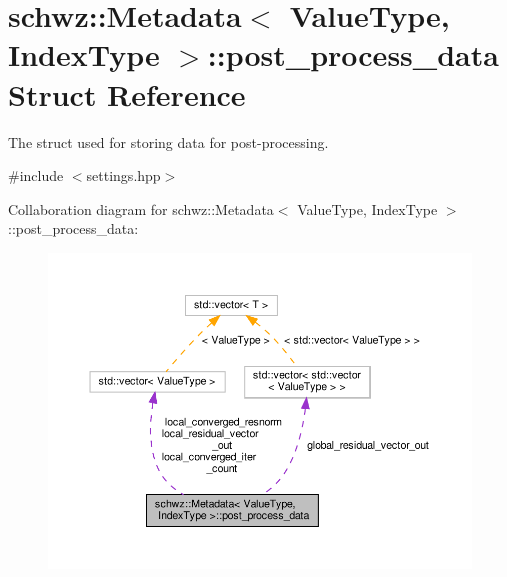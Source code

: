 \hypertarget{structschwz_1_1Metadata_1_1post__process__data}{}\section{schwz\+:\+:Metadata$<$ Value\+Type, Index\+Type $>$\+:\+:post\+\_\+process\+\_\+data Struct Reference}
\label{structschwz_1_1Metadata_1_1post__process__data}


The struct used for storing data for post-\/processing.  




{\ttfamily \#include $<$settings.\+hpp$>$}



Collaboration diagram for schwz\+:\+:Metadata$<$ Value\+Type, Index\+Type $>$\+:\+:post\+\_\+process\+\_\+data\+:
\nopagebreak
\begin{figure}[H]
\begin{center}
\leavevmode
\includegraphics[width=350pt]{structschwz_1_1Metadata_1_1post__process__data__coll__graph}
\end{center}
\end{figure}
